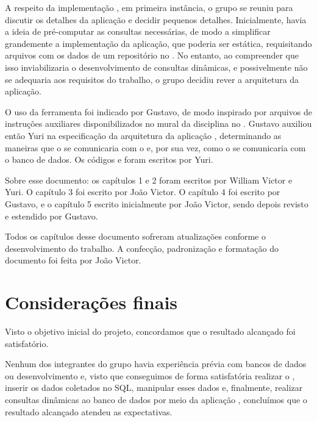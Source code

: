    A respeito da implementação , em primeira instância, o grupo se reuniu para discutir os detalhes da aplicação 
   e decidir pequenos detalhes. Inicialmente, havia a ideia de pré-computar as consultas necessárias, de modo a simplificar
   grandemente a implementação da aplicação, que poderia ser estática, requisitando arquivos  com os dados de um
   repositório no . No entanto, ao compreender que isso inviabilizaria o desenvolvimento de consultas dinâmicas,
   e possivelmente não se adequaria aos requisitos do trabalho, o grupo decidiu rever a arquitetura da aplicação.

   O uso da ferramenta  foi indicado por Gustavo, de modo inspirado por arquivos de instruções auxiliares
   disponibilizados no mural da disciplina no . Gustavo auxiliou então Yuri na especificação da
   arquitetura da aplicação , determinando as maneiras que o  se comunicaria com o  e, por sua vez, como o  se comunicaria com o banco de dados. Os códigos  e  foram escritos por Yuri.

    Sobre esse documento: os capítulos 1 e 2 foram escritos por William Victor e Yuri.
    O capítulo 3 foi escrito por João Victor.
    O capítulo 4 foi escrito por Gustavo, e o capítulo 5 escrito inicialmente por João Victor,
    sendo depois revisto e estendido por Gustavo.

    Todos os capítulos desse documento sofreram atualizações conforme o desenvolvimento do trabalho. A confecção, padronização
    e formatação do documento foi feita por João Victor.

\chapter{Considerações finais}


   Visto o objetivo inicial do projeto, concordamos que o resultado alcançado foi satisfatório. 
   
   Nenhum dos integrantes do grupo havia experiência prévia com bancos de dados ou desenvolvimento  e, visto que conseguimos de forma satisfatória realizar o , inserir os dados coletados no SQL, manipular esses dados e, finalmente, realizar consultas dinâmicas ao banco de dados por meio da aplicação , concluímos que o resultado alcançado atendeu as expectativas.
